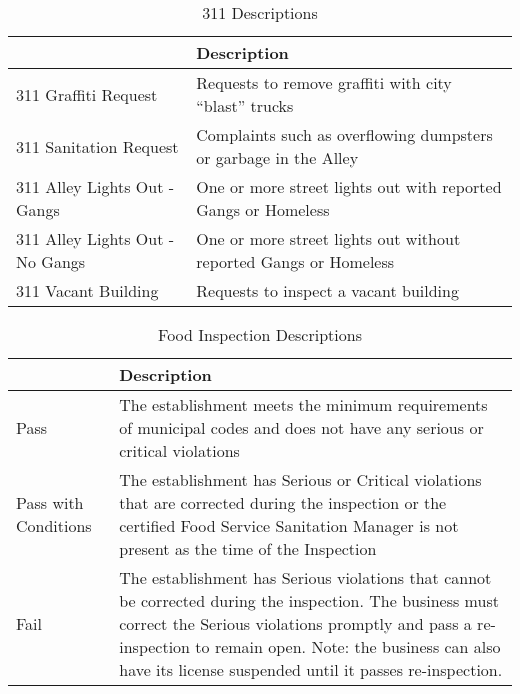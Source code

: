 \documentclass{article}
\begin{document}
\clearpage
\begin{table}
\begin{threeparttable}
\caption{311 Descriptions}
\begin{tabular}{ |p{6cm}||p{10cm}|  }
 \hline
 \hline
 & Description\\
  \hline
 311 Graffiti Request                & Requests to remove graffiti with city “blast” trucks    \\
 \hline
 311 Sanitation Request              & Complaints such as overflowing dumpsters or garbage in the Alley     \\
 \hline
 311 Alley Lights Out - Gangs        & One or more street lights out with reported Gangs or Homeless      \\
 \hline
 311 Alley Lights Out - No Gangs     & One or more street lights out without reported Gangs or Homeless      \\
 \hline
 311 Vacant Building  & Requests to inspect a vacant building      \\

  \hline
\end{tabular}

    \end{threeparttable}
\end{table}
\clearpage
\begin{table}
\begin{threeparttable}
\caption{Food Inspection Descriptions}
\begin{tabular}{ |p{4cm}||p{12cm}|  }
 \hline
 \hline
 & Description\\
  \hline
 Pass                & The establishment meets the minimum requirements of municipal codes and does not have any serious or critical violations 
    \\
 \hline
 Pass with Conditions              & The establishment has Serious or Critical violations that are corrected during the inspection or the certified Food Service Sanitation Manager is not present as the time of the Inspection     \\
 \hline
 Fail        & The establishment has Serious violations that cannot be corrected during the inspection. The business must correct the Serious violations promptly and pass a re- inspection to remain open. Note: the business can also have its license suspended until it passes re-inspection.       \\


  \hline
\end{tabular}

    \end{threeparttable}
\end{table}
\clearpage
\end{document}
